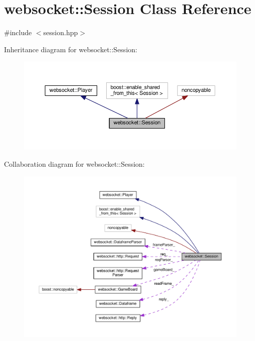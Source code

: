 \hypertarget{classwebsocket_1_1Session}{}\section{websocket\+:\+:Session Class Reference}
\label{classwebsocket_1_1Session}


{\ttfamily \#include $<$session.\+hpp$>$}



Inheritance diagram for websocket\+:\+:Session\+:
\nopagebreak
\begin{figure}[H]
\begin{center}
\leavevmode
\includegraphics[width=350pt]{classwebsocket_1_1Session__inherit__graph}
\end{center}
\end{figure}


Collaboration diagram for websocket\+:\+:Session\+:
\nopagebreak
\begin{figure}[H]
\begin{center}
\leavevmode
\includegraphics[width=350pt]{classwebsocket_1_1Session__coll__graph}
\end{center}
\end{figure}
